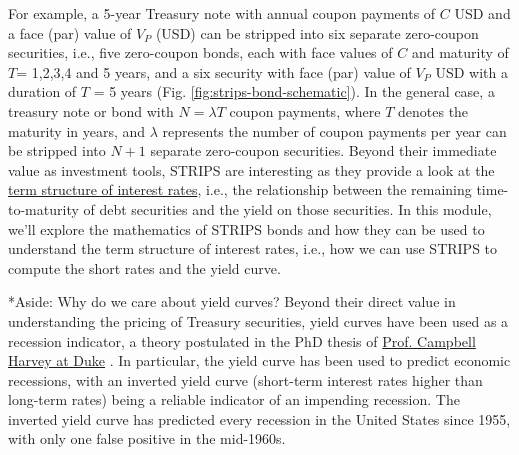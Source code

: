 \documentclass[11pt]{article}
\makeatletter
\theoremstyle{definition}
\renewcommand\subsubsection{\@startsection
	{subsubsection}{2}{0mm}
	{-0.05in}
	{-0.5\baselineskip}
	{\normalfont\normalsize\itshape\bfseries}}
\makeatother
\begin{document}
For example, a 5-year Treasury note with annual coupon payments of $C$ USD and a face (par) value of $V_{P}$ (USD)
can be stripped into six separate zero-coupon securities, i.e., five zero-coupon bonds, each with face values of $C$ 
and maturity of $T$= 1,2,3,4 and 5 years, and a six security with face  (par) value of $V_{P}$ USD with a duration of $T$ = 5 years (Fig. \ref{fig:strips-bond-schematic}). 
In the general case, a treasury note or bond with $N=\lambda{T}$ coupon payments, where $T$ denotes the maturity in years, and $\lambda$ represents 
the number of coupon payments per year can be stripped into $N+1$ separate zero-coupon securities.
Beyond their immediate value as investment tools, STRIPS are interesting as they provide a look at the 
\href{https://www.federalreserve.gov/data/yield-curve-models.htm}{term structure of interest rates}, i.e., the relationship between the remaining time-to-maturity of debt securities 
and the yield on those securities. In this module, we'll explore the mathematics of STRIPS bonds and how they can be used to understand the term structure of interest rates, 
i.e., how we can use STRIPS to compute the short rates and the yield curve.

\subsubsection*{Aside: Why do we care about yield curves?}
Beyond their direct value in understanding the pricing of Treasury securities, 
yield curves have been used as a recession indicator, a theory postulated in the PhD thesis of \href{https://people.duke.edu/~charvey/}{Prof. Campbell Harvey at Duke} \citep{Harvery-Thesis-1986}.
In particular, the yield curve has been used to predict economic recessions, with an inverted yield curve (short-term interest rates higher than long-term rates) being a reliable indicator of an impending recession.
The inverted yield curve has predicted every recession in the United States since 1955, with only one false positive in the mid-1960s.
\end{document}
